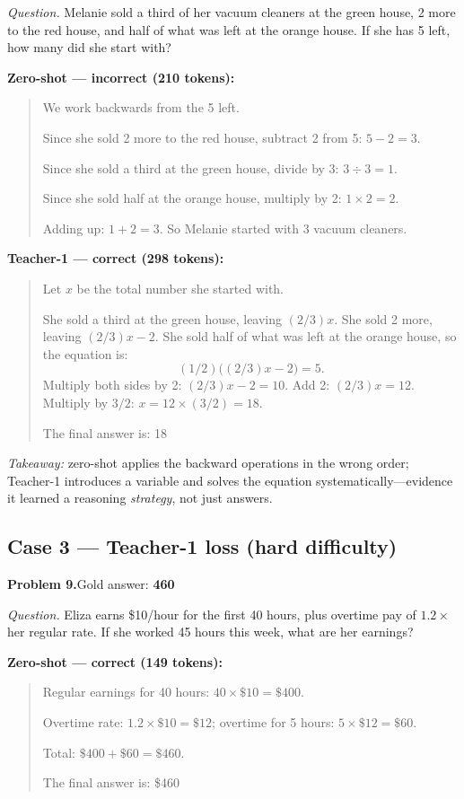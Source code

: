 \documentclass[11pt]{article}
\begin{document}
\textit{Question.} Melanie sold a third of her vacuum cleaners at the green house,
2 more to the red house, and half of what was left at the orange house. If she has
5 left, how many did she start with?

\noindent\textbf{Zero-shot --- incorrect (210 tokens):}
\begin{quote}\small
We work backwards from the 5 left.

Since she sold 2 more to the red house, subtract 2 from 5: $5 - 2 = 3$.

Since she sold a third at the green house, divide by 3: $3 \div 3 = 1$.

Since she sold half at the orange house, multiply by 2: $1 \times 2 = 2$.

Adding up: $1 + 2 = 3$. So Melanie started with 3 vacuum cleaners.
\end{quote}

\noindent\textbf{Teacher-1 --- correct (298 tokens):}
\begin{quote}\small
Let $x$ be the total number she started with.

She sold a third at the green house, leaving $(2/3)x$. She sold 2 more, leaving
$(2/3)x - 2$. She sold half of what was left at the orange house, so the equation is:
$$(1/2)\big((2/3)x - 2\big) = 5.$$
Multiply both sides by 2: $(2/3)x - 2 = 10$. Add 2: $(2/3)x = 12$. Multiply by
$3/2$: $x = 12 \times (3/2) = 18$.

The final answer is: 18
\end{quote}
\emph{Takeaway:} zero-shot applies the backward operations in the wrong order;
Teacher-1 introduces a variable and solves the equation systematically---evidence
it learned a reasoning \emph{strategy}, not just answers.

\subsection*{Case 3 --- Teacher-1 loss (hard difficulty)}
\noindent\textbf{Problem 9.}\quad Gold answer: \textbf{460}

\textit{Question.} Eliza earns \$10/hour for the first 40 hours, plus overtime pay
of $1.2\times$ her regular rate. If she worked 45 hours this week, what are her
earnings?

\noindent\textbf{Zero-shot --- correct (149 tokens):}
\begin{quote}\small
Regular earnings for 40 hours: $40 \times \$10 = \$400$.

Overtime rate: $1.2 \times \$10 = \$12$; overtime for 5 hours: $5 \times \$12 = \$60$.

Total: $\$400 + \$60 = \$460$.

The final answer is: \$460
\end{quote}
\end{document}
